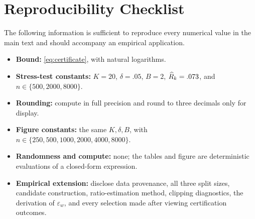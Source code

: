 \section{Reproducibility Checklist}
\label{app:checklist}

The following information is sufficient to reproduce every numerical value in the
main text and should accompany an empirical application.
\begin{itemize}
  \item \textbf{Bound:} \cref{eq:certificate}, with natural logarithms.
  \item \textbf{Stress-test constants:} $K=20$, $\delta=.05$, $B=2$,
        $\widehat R_k=.073$, and $n\in\{500,2000,8000\}$.
  \item \textbf{Rounding:} compute in full precision and round to three decimals
        only for display.
  \item \textbf{Figure constants:} the same $K,\delta,B$, with
        $n\in\{250,500,1000,2000,4000,8000\}$.
  \item \textbf{Randomness and compute:} none; the tables and figure are
        deterministic evaluations of a closed-form expression.
  \item \textbf{Empirical extension:} disclose data provenance, all three split
        sizes, candidate construction, ratio-estimation method, clipping diagnostics,
        the derivation of $\varepsilon_w$, and every selection made after viewing
        certification outcomes.
\end{itemize}
